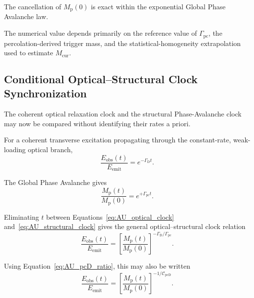 The cancellation of
\(M_{\mathrm p}(0)\)
is exact within the exponential Global Phase Avalanche law.

The numerical value depends primarily on the reference value of
\(\Gamma_{\mathrm{pc}}\), the percolation-derived trigger mass, and the
statistical-homogeneity extrapolation used to estimate
\(M_{\mathrm{cur}}\).


\subsection{Conditional Optical--Structural Clock Synchronization}

The coherent optical relaxation clock and the structural Phase-Avalanche clock
may now be compared without identifying their rates a priori.

For a coherent transverse excitation propagating through the constant-rate,
weak-loading optical branch,
\begin{equation}
    \frac{
        E_{\mathrm{obs}}(t)
    }{
        E_{\mathrm{emit}}
    }
    =
    e^{-\Gamma_{\mathrm D}t}.
    \label{eq:AU_optical_clock}
\end{equation}

The Global Phase Avalanche gives
\begin{equation}
    \frac{
        M_{\mathrm p}(t)
    }{
        M_{\mathrm p}(0)
    }
    =
    e^{+\Gamma_{\mathrm{pc}}t}.
    \label{eq:AU_structural_clock}
\end{equation}

Eliminating \(t\) between
Equations~\eqref{eq:AU_optical_clock}
and~\eqref{eq:AU_structural_clock}
gives the general optical--structural clock relation
\begin{equation}
    \boxed{
    \frac{
        E_{\mathrm{obs}}(t)
    }{
        E_{\mathrm{emit}}
    }
    =
    \left[
        \frac{
            M_{\mathrm p}(t)
        }{
            M_{\mathrm p}(0)
        }
    \right]^{
        -\Gamma_{\mathrm D}/\Gamma_{\mathrm{pc}}
    }.
    }
    \label{eq:AU_general_clock_relation}
\end{equation}

Using
Equation~\eqref{eq:AU_pcD_ratio},
this may also be written
\begin{equation}
    \frac{
        E_{\mathrm{obs}}(t)
    }{
        E_{\mathrm{emit}}
    }
    =
    \left[
        \frac{
            M_{\mathrm p}(t)
        }{
            M_{\mathrm p}(0)
        }
    \right]^{-1/\mathcal C_{\mathrm{pcD}}}.
\end{equation}

